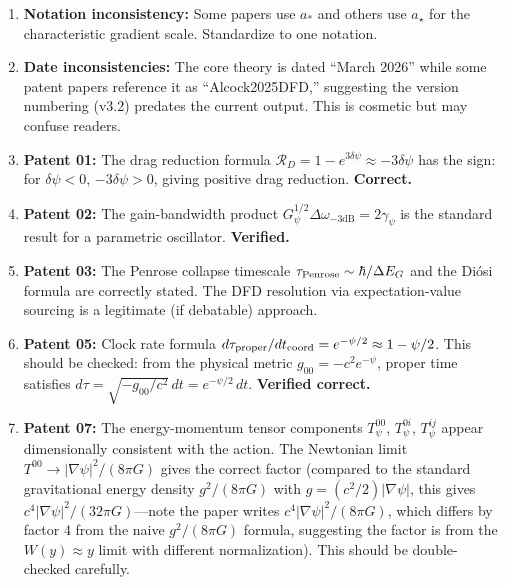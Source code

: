 \documentclass[12pt,a4paper]{article}
\begin{document}
\begin{enumerate}[label=MN-\arabic*.]

\item \textbf{Notation inconsistency:} Some papers use $a_*$ and others use
$a_\star$ for the characteristic gradient scale. Standardize to one notation.

\item \textbf{Date inconsistencies:} The core theory is dated ``March 2026''
while some patent papers reference it as ``Alcock2025DFD,'' suggesting the
version numbering (v3.2) predates the current output. This is cosmetic but
may confuse readers.

\item \textbf{Patent 01:} The drag reduction formula
$\mathcal{R}_D = 1 - e^{3\delta\psi} \approx -3\delta\psi$ has the sign:
for $\delta\psi < 0$, $-3\delta\psi > 0$, giving positive drag reduction.
\textbf{Correct.}

\item \textbf{Patent 02:} The gain-bandwidth product
$G_\psi^{1/2}\Delta\omega_{-3\text{dB}} = 2\gamma_\psi$ is the standard
result for a parametric oscillator. \textbf{Verified.}

\item \textbf{Patent 03:} The Penrose collapse timescale
$\tau_{\rm Penrose} \sim \hbar/\Delta E_G$ and the Di\'{o}si formula
are correctly stated. The DFD resolution via expectation-value sourcing
is a legitimate (if debatable) approach.

\item \textbf{Patent 05:} Clock rate formula
$d\tau_{\rm proper}/dt_{\rm coord} = e^{-\psi/2} \approx 1 - \psi/2$.
This should be checked: from the physical metric
$g_{00} = -c^2 e^{-\psi}$, proper time satisfies
$d\tau = \sqrt{-g_{00}/c^2}\,dt = e^{-\psi/2}\,dt$.
\textbf{Verified correct.}

\item \textbf{Patent 07:} The energy-momentum tensor components
$T^{00}_\psi$, $T^{0i}_\psi$, $T^{ij}_\psi$ appear dimensionally
consistent with the action. The Newtonian limit
$T^{00} \to |\nabla\psi|^2/(8\pi G)$ gives the correct factor
(compared to the standard gravitational energy density
$g^2/(8\pi G)$ with $g = (c^2/2)|\nabla\psi|$, this gives
$c^4|\nabla\psi|^2/(32\pi G)$---note the paper writes
$c^4|\nabla\psi|^2/(8\pi G)$, which differs by factor 4 from
the naive $g^2/(8\pi G)$ formula, suggesting the factor is
from the $W(y) \approx y$ limit with different normalization).
This should be double-checked carefully.


\end{enumerate}
\end{document}
